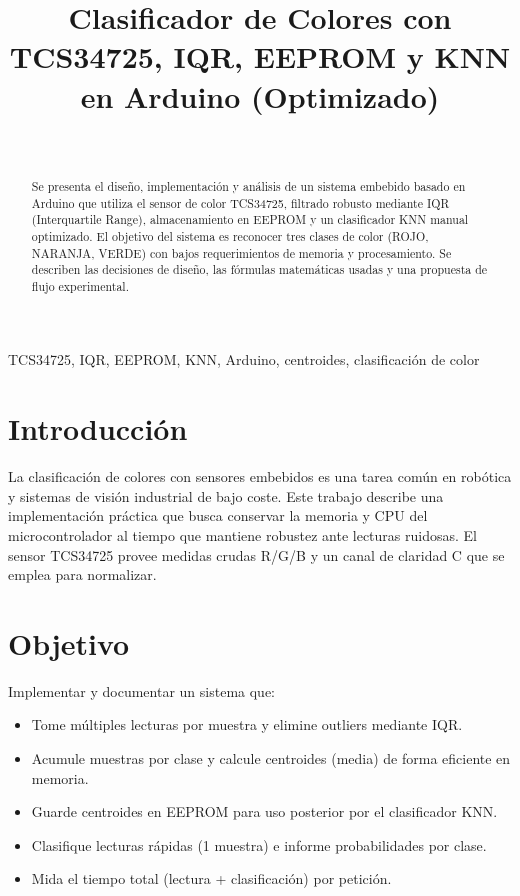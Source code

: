 \documentclass[conference]{IEEEtran}
\title{Clasificador de Colores con TCS34725, IQR, EEPROM y KNN en Arduino (Optimizado)}
\author{
  \IEEEauthorblockN{Alejandro Martinez\\Daniel Santiago\\Yurliana Niebles\\Isaac Montes}
  \\
  \IEEEauthorblockA{\IEEEauthorrefmark{1} Universidad De la Costa \\
  \texttt{}}
}
\begin{document}
\maketitle
\begin{abstract}
Se presenta el diseño, implementación y análisis de un sistema embebido basado en Arduino que utiliza el sensor de color TCS34725, filtrado robusto mediante IQR (Interquartile Range), almacenamiento en EEPROM y un clasificador KNN manual optimizado. El objetivo del sistema es reconocer tres clases de color (ROJO, NARANJA, VERDE) con bajos requerimientos de memoria y procesamiento. Se describen las decisiones de diseño, las fórmulas matemáticas usadas y una propuesta de flujo experimental.
\end{abstract}

\begin{IEEEkeywords}
TCS34725, IQR, EEPROM, KNN, Arduino, centroides, clasificación de color
\end{IEEEkeywords}

\section{Introducción}
La clasificación de colores con sensores embebidos es una tarea común en robótica y sistemas de visión industrial de bajo coste. Este trabajo describe una implementación práctica que busca conservar la memoria y CPU del microcontrolador al tiempo que mantiene robustez ante lecturas ruidosas. El sensor TCS34725 provee medidas crudas R/G/B y un canal de claridad C que se emplea para normalizar.

\section{Objetivo}
Implementar y documentar un sistema que:
\begin{itemize}
  \item Tome múltiples lecturas por muestra y elimine outliers mediante IQR.
  \item Acumule muestras por clase y calcule centroides (media) de forma eficiente en memoria.
  \item Guarde centroides en EEPROM para uso posterior por el clasificador KNN.
  \item Clasifique lecturas rápidas (1 muestra) e informe probabilidades por clase.
  \item Mida el tiempo total (lectura + clasificación) por petición.
\end{itemize}
\end{document}
